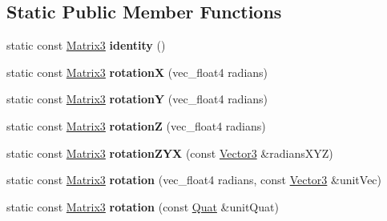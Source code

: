 \subsection*{Static Public Member Functions}
\begin{DoxyCompactItemize}
\item 
\hypertarget{classVectormath_1_1Soa_1_1Matrix3_ade7f5d5c5ce8481e5b82faea098649dd}{static const \hyperlink{classVectormath_1_1Soa_1_1Matrix3}{Matrix3} {\bfseries identity} ()}\label{classVectormath_1_1Soa_1_1Matrix3_ade7f5d5c5ce8481e5b82faea098649dd}

\item 
\hypertarget{classVectormath_1_1Soa_1_1Matrix3_a531ebb316fc1e1e23083fa5e03344b37}{static const \hyperlink{classVectormath_1_1Soa_1_1Matrix3}{Matrix3} {\bfseries rotation\-X} (vec\-\_\-float4 radians)}\label{classVectormath_1_1Soa_1_1Matrix3_a531ebb316fc1e1e23083fa5e03344b37}

\item 
\hypertarget{classVectormath_1_1Soa_1_1Matrix3_a57e23a6cb94be05ac34eebccbfc9c1e1}{static const \hyperlink{classVectormath_1_1Soa_1_1Matrix3}{Matrix3} {\bfseries rotation\-Y} (vec\-\_\-float4 radians)}\label{classVectormath_1_1Soa_1_1Matrix3_a57e23a6cb94be05ac34eebccbfc9c1e1}

\item 
\hypertarget{classVectormath_1_1Soa_1_1Matrix3_a6205b2d40c6a0dd4fd8752e901c8c1d1}{static const \hyperlink{classVectormath_1_1Soa_1_1Matrix3}{Matrix3} {\bfseries rotation\-Z} (vec\-\_\-float4 radians)}\label{classVectormath_1_1Soa_1_1Matrix3_a6205b2d40c6a0dd4fd8752e901c8c1d1}

\item 
\hypertarget{classVectormath_1_1Soa_1_1Matrix3_a0d24a91412e584adad69cd00bc721b32}{static const \hyperlink{classVectormath_1_1Soa_1_1Matrix3}{Matrix3} {\bfseries rotation\-Z\-Y\-X} (const \hyperlink{classVectormath_1_1Soa_1_1Vector3}{Vector3} \&radians\-X\-Y\-Z)}\label{classVectormath_1_1Soa_1_1Matrix3_a0d24a91412e584adad69cd00bc721b32}

\item 
\hypertarget{classVectormath_1_1Soa_1_1Matrix3_a4a7ce1f0953cab9dadbafed80fdc7bee}{static const \hyperlink{classVectormath_1_1Soa_1_1Matrix3}{Matrix3} {\bfseries rotation} (vec\-\_\-float4 radians, const \hyperlink{classVectormath_1_1Soa_1_1Vector3}{Vector3} \&unit\-Vec)}\label{classVectormath_1_1Soa_1_1Matrix3_a4a7ce1f0953cab9dadbafed80fdc7bee}

\item 
\hypertarget{classVectormath_1_1Soa_1_1Matrix3_a1d8a8a787d430a92e1eb5372402db114}{static const \hyperlink{classVectormath_1_1Soa_1_1Matrix3}{Matrix3} {\bfseries rotation} (const \hyperlink{classVectormath_1_1Soa_1_1Quat}{Quat} \&unit\-Quat)}\label{classVectormath_1_1Soa_1_1Matrix3_a1d8a8a787d430a92e1eb5372402db114}


\end{DoxyCompactItemize}

